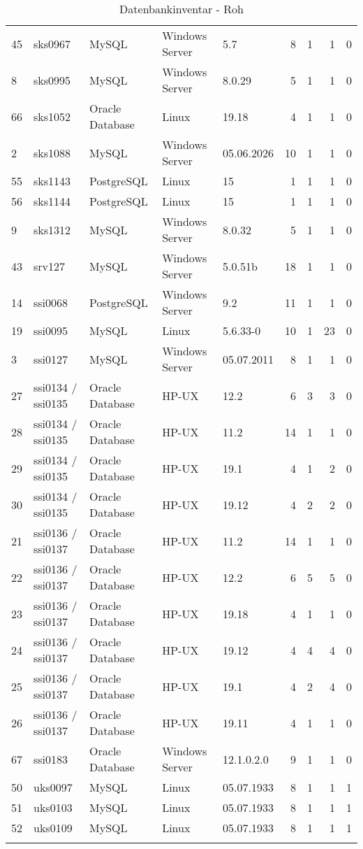 \begin{longtable}[H]{lllllrrrr}
45 & sks0967 & MySQL & Windows Server & 5.7 & 8 & 1 & 1 & 0 \\
8 & sks0995 & MySQL & Windows Server & 8.0.29  & 5 & 1 & 1 & 0 \\
66 & sks1052 & Oracle Database & Linux & 19.18 & 4 & 1 & 1 & 0 \\
2 & sks1088 & MySQL & Windows Server & 05.06.2026 & 10 & 1 & 1 & 0 \\
55 & sks1143 & PostgreSQL & Linux & 15 & 1 & 1 & 1 & 0 \\
56 & sks1144 & PostgreSQL & Linux & 15 & 1 & 1 & 1 & 0 \\
9 & sks1312 & MySQL & Windows Server & 8.0.32 & 5 & 1 & 1 & 0 \\
43 & srv127 & MySQL & Windows Server & 5.0.51b & 18 & 1 & 1 & 0 \\
14 & ssi0068 & PostgreSQL & Windows Server & 9.2 & 11 & 1 & 1 & 0 \\
19 & ssi0095 & MySQL & Linux & 5.6.33-0 & 10 & 1 & 23 & 0 \\
3 & ssi0127 & MySQL & Windows Server & 05.07.2011 & 8 & 1 & 1 & 0 \\
27 & ssi0134 / ssi0135 & Oracle Database & HP-UX & 12.2 & 6 & 3 & 3 & 0 \\
28 & ssi0134 / ssi0135 & Oracle Database & HP-UX & 11.2 & 14 & 1 & 1 & 0 \\
29 & ssi0134 / ssi0135 & Oracle Database & HP-UX & 19.1 & 4 & 1 & 2 & 0 \\
30 & ssi0134 / ssi0135 & Oracle Database & HP-UX & 19.12 & 4 & 2 & 2 & 0 \\
21 & ssi0136 / ssi0137 & Oracle Database & HP-UX & 11.2 & 14 & 1 & 1 & 0 \\
22 & ssi0136 / ssi0137 & Oracle Database & HP-UX & 12.2 & 6 & 5 & 5 & 0 \\
23 & ssi0136 / ssi0137 & Oracle Database & HP-UX & 19.18 & 4 & 1 & 1 & 0 \\
24 & ssi0136 / ssi0137 & Oracle Database & HP-UX & 19.12 & 4 & 4 & 4 & 0 \\
25 & ssi0136 / ssi0137 & Oracle Database & HP-UX & 19.1 & 4 & 2 & 4 & 0 \\
26 & ssi0136 / ssi0137 & Oracle Database & HP-UX & 19.11 & 4 & 1 & 1 & 0 \\
67 & ssi0183 & Oracle Database & Windows Server & 12.1.0.2.0 & 9 & 1 & 1 & 0 \\
50 & uks0097 & MySQL & Linux & 05.07.1933 & 8 & 1 & 1 & 1 \\
51 & uks0103 & MySQL & Linux & 05.07.1933 & 8 & 1 & 1 & 1 \\
52 & uks0109 & MySQL & Linux & 05.07.1933 & 8 & 1 & 1 & 1 \\
\caption{Datenbankinventar - Roh} \label{db_inventory}
\end{longtable}

